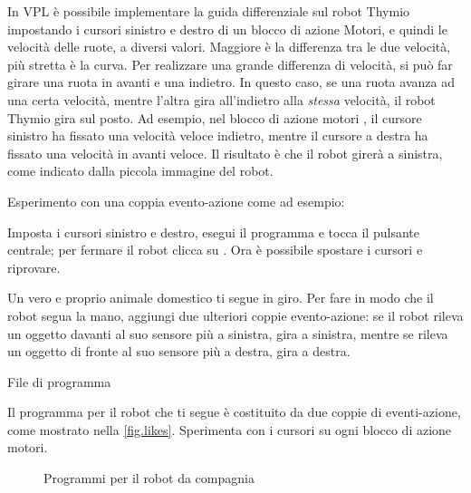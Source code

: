 In VPL è possibile implementare la guida differenziale sul robot Thymio
impostando i cursori sinistro e destro di un blocco di azione Motori, e quindi le velocità delle ruote, a
diversi valori.
Maggiore è la differenza tra le due velocità, più stretta è la curva. Per
realizzare una grande differenza di velocità, si può far girare una ruota in avanti
e una indietro. In questo caso, se una ruota avanza ad una
certa velocità, mentre l'altra gira all'indietro alla \emph{stessa}
velocità, il robot Thymio gira sul posto.
Ad esempio, nel blocco di azione motori , il cursore sinistro ha
fissato una velocità veloce indietro, mentre il cursore a destra ha fissato
una velocità in avanti veloce.
Il risultato è che il robot girerà a sinistra, come indicato dalla piccola immagine del robot.

Esperimento con una coppia evento-azione come ad esempio: 

Imposta i cursori sinistro e destro, esegui il programma
e tocca il pulsante centrale; per fermare il robot clicca su .
Ora è possibile spostare i cursori e riprovare.




Un vero e proprio animale domestico ti segue in giro. Per fare in modo che il robot segua la mano, aggiungi
due ulteriori coppie evento-azione: se il robot rileva un oggetto davanti al suo sensore più a sinistra, gira a sinistra, mentre se rileva
un oggetto di fronte al suo sensore più a destra, gira a destra.


{\raggedleft \hfill File di programma }

Il programma per il robot che ti segue è costituito da due coppie di eventi-azione, come mostrato nella \cref{fig.likes}.
Sperimenta con i cursori su ogni blocco di azione motori.

\begin{figure}
	\hfill
	\caption{Programmi per il robot da compagnia}
\end{figure}


